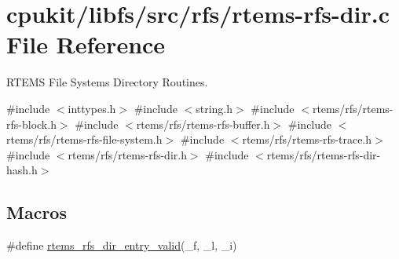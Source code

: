 \hypertarget{rtems-rfs-dir_8c}{}\section{cpukit/libfs/src/rfs/rtems-\/rfs-\/dir.c File Reference}
\label{rtems-rfs-dir_8c}


R\+T\+E\+MS File Systems Directory Routines.  


{\ttfamily \#include $<$inttypes.\+h$>$}\newline
{\ttfamily \#include $<$string.\+h$>$}\newline
{\ttfamily \#include $<$rtems/rfs/rtems-\/rfs-\/block.\+h$>$}\newline
{\ttfamily \#include $<$rtems/rfs/rtems-\/rfs-\/buffer.\+h$>$}\newline
{\ttfamily \#include $<$rtems/rfs/rtems-\/rfs-\/file-\/system.\+h$>$}\newline
{\ttfamily \#include $<$rtems/rfs/rtems-\/rfs-\/trace.\+h$>$}\newline
{\ttfamily \#include $<$rtems/rfs/rtems-\/rfs-\/dir.\+h$>$}\newline
{\ttfamily \#include $<$rtems/rfs/rtems-\/rfs-\/dir-\/hash.\+h$>$}\newline
\subsection*{Macros}
\begin{DoxyCompactItemize}
\item 
\#define \mbox{\hyperlink{rtems-rfs-dir_8c_a7c9a4896613364950a98984676e74fd8}{rtems\+\_\+rfs\+\_\+dir\+\_\+entry\+\_\+valid}}(\+\_\+f,  \+\_\+l,  \+\_\+i)
\end{DoxyCompactItemize}
